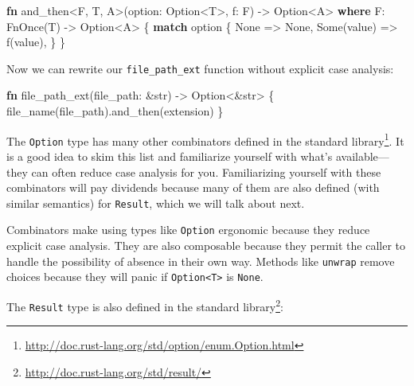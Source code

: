 \documentclass[a4paper,]{book}
\newenvironment{Shaded}{\begin{snugshade}}{\end{snugshade}}
\newcommand{\KeywordTok}[1]{\textcolor[rgb]{0.13,0.29,0.53}{\textbf{{#1}}}}
\newcommand{\DataTypeTok}[1]{\textcolor[rgb]{0.13,0.29,0.53}{{#1}}}
\newcommand{\ConstantTok}[1]{\textcolor[rgb]{0.00,0.00,0.00}{{#1}}}
\newcommand{\BuiltInTok}[1]{{#1}}
\newcommand{\NormalTok}[1]{{#1}}
\renewcommand{\href}[2]{#2\footnote{\url{#1}}}
\begin{document}
\begin{Shaded}
\begin{Highlighting}[]
\KeywordTok{fn} \NormalTok{and_then<F, T, A>(option: }\DataTypeTok{Option}\NormalTok{<T>, f: F) -> }\DataTypeTok{Option}\NormalTok{<A>}
        \KeywordTok{where} \NormalTok{F: }\BuiltInTok{FnOnce}\NormalTok{(T) -> }\DataTypeTok{Option}\NormalTok{<A> \{}
    \KeywordTok{match} \NormalTok{option \{}
        \ConstantTok{None} \NormalTok{=> }\ConstantTok{None}\NormalTok{,}
        \ConstantTok{Some}\NormalTok{(value) => f(value),}
    \NormalTok{\}}
\NormalTok{\}}
\end{Highlighting}
\end{Shaded}

Now we can rewrite our \texttt{file\_path\_ext} function without
explicit case analysis:

\begin{Shaded}
\begin{Highlighting}[]
\KeywordTok{fn} \NormalTok{file_path_ext(file_path: &}\DataTypeTok{str}\NormalTok{) -> }\DataTypeTok{Option}\NormalTok{<&}\DataTypeTok{str}\NormalTok{> \{}
    \NormalTok{file_name(file_path).and_then(extension)}
\NormalTok{\}}
\end{Highlighting}
\end{Shaded}

The \texttt{Option} type has many other combinators
\href{http://doc.rust-lang.org/std/option/enum.Option.html}{defined in
the standard library}. It is a good idea to skim this list and
familiarize yourself with what's available---they can often reduce case
analysis for you. Familiarizing yourself with these combinators will pay
dividends because many of them are also defined (with similar semantics)
for \texttt{Result}, which we will talk about next.

Combinators make using types like \texttt{Option} ergonomic because they
reduce explicit case analysis. They are also composable because they
permit the caller to handle the possibility of absence in their own way.
Methods like \texttt{unwrap} remove choices because they will panic if
\texttt{Option\textless{}T\textgreater{}} is \texttt{None}.


The \texttt{Result} type is also
\href{http://doc.rust-lang.org/std/result/}{defined in the standard
library}:
\end{document}
